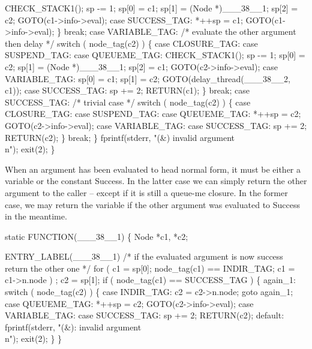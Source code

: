             CHECK_STACK1();
            sp   -= 1;
            sp[0] = c1;
            sp[1] = (Node *)___38__1;
            sp[2] = c2;
            GOTO(c1->info->eval);
        case SUCCESS_TAG:
            *++sp = c1;
            GOTO(c1->info->eval);
        \}
        break;
    case VARIABLE_TAG:
        /* evaluate the other argument then delay */
        switch ( node_tag(c2) )
        \{
        case CLOSURE_TAG:
        case SUSPEND_TAG:
        case QUEUEME_TAG:
            CHECK_STACK1();
            sp   -= 1;
            sp[0] = c2;
            sp[1] = (Node *)___38__1;
            sp[2] = c1;
            GOTO(c2->info->eval);
        case VARIABLE_TAG:
            sp[0] = c1;
            sp[1] = c2;
            GOTO(delay_thread(___38__2, c1));
        case SUCCESS_TAG:
            sp += 2;
            RETURN(c1);
        \}
        break;
    case SUCCESS_TAG:
        /* trivial case */
        switch ( node_tag(c2) )
        \{
        case CLOSURE_TAG:
        case SUSPEND_TAG:
        case QUEUEME_TAG:
            *++sp = c2;
            GOTO(c2->info->eval);
        case VARIABLE_TAG:
        case SUCCESS_TAG:
            sp += 2;
            RETURN(c2);
        \}
        break;
    \}
    fprintf(stderr, "(&) invalid argument\\n");
    exit(2);
\}

\nwendcode{}\nwdocspar
When an argument has been evaluated to head normal form, it must be
either a variable or the constant {\Tt{}Success\nwendquote}. In the latter case we
can simply return the other argument to the caller -- except if it is
still a queue-me closure. In the former case, we may return the
variable if the other argument was evaluated to {\Tt{}Success\nwendquote} in the
meantime.

\nwenddocs{}\plusendmoddef\nwstartdeflinemarkup{}\nwenddeflinemarkup
static
FUNCTION(___38__1)
\{
    Node *c1, *c2;

 ENTRY_LABEL(___38__1)
    /* if the evaluated argument is now success return the other one */
    for ( c1 = sp[0]; node_tag(c1) == INDIR_TAG; c1 = c1->n.node )
        ;
    c2 = sp[1];
    if ( node_tag(c1) == SUCCESS_TAG )
    \{
    again_1:
        switch ( node_tag(c2) )
        \{
        case INDIR_TAG:
            c2 = c2->n.node;
            goto again_1;
        case QUEUEME_TAG:
            *++sp = c2;
            GOTO(c2->info->eval);
        case VARIABLE_TAG:
        case SUCCESS_TAG:
            sp += 2;
            RETURN(c2);
        default:
            fprintf(stderr, "(&): invalid argument\\n");
            exit(2);
        \}
    \}

